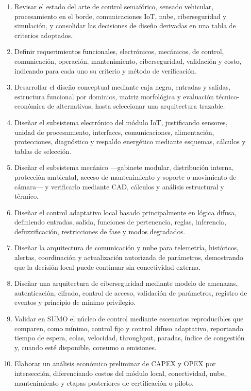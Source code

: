 \begin{enumerate}[label=\textbf{OE\arabic*:},leftmargin=1.7cm]
\item Revisar el estado del arte de control semafórico, sensado vehicular, procesamiento en el borde,
comunicaciones IoT, nube, ciberseguridad y simulación, y consolidar las decisiones de diseño derivadas en
una tabla de criterios adoptados.
\item Definir requerimientos funcionales, electrónicos, mecánicos, de control, comunicación, operación,
mantenimiento, ciberseguridad, validación y costo, indicando para cada uno su criterio y método de
verificación.
\item Desarrollar el diseño conceptual mediante caja negra, entradas y salidas, estructura funcional por
dominios, matriz morfológica y evaluación técnico-económica de alternativas, hasta seleccionar una
arquitectura trazable.
\item Diseñar el subsistema electrónico del módulo IoT, justificando sensores, unidad de procesamiento,
interfaces, comunicaciones, alimentación, protecciones, diagnóstico y respaldo energético mediante esquemas,
cálculos y tablas de selección.
\item Diseñar el subsistema mecánico —gabinete modular, distribución interna, protección ambiental, acceso
de mantenimiento y soporte o movimiento de cámara— y verificarlo mediante CAD, cálculos y análisis
estructural y térmico.
\item Diseñar el control adaptativo local basado principalmente en lógica difusa, definiendo entradas,
salida, funciones de pertenencia, reglas, inferencia, defuzzificación, restricciones de fase y modos
degradados.
\item Diseñar la arquitectura de comunicación y nube para telemetría, históricos, alertas, coordinación y
actualización autorizada de parámetros, demostrando que la decisión local puede continuar sin conectividad
externa.
\item Diseñar una arquitectura de ciberseguridad mediante modelo de amenazas, autenticación, cifrado,
control de acceso, validación de parámetros, registro de eventos y principio de mínimo privilegio.
\item Validar en SUMO el núcleo de control mediante escenarios reproducibles que comparen, como mínimo,
control fijo y control difuso adaptativo, reportando tiempo de espera, colas, velocidad, throughput,
paradas, índice de congestión y, cuando esté disponible, consumo o emisiones.
\item Elaborar un análisis económico preliminar de CAPEX y OPEX por intersección, diferenciando costos del
módulo local, conectividad, nube, mantenimiento y etapas posteriores de certificación o piloto.
\end{enumerate}

